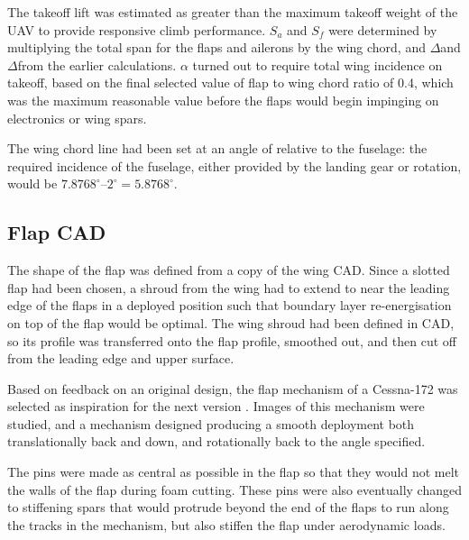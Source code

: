 \documentclass[../../main.tex]{subfiles}
\begin{document}
The takeoff lift was estimated as  greater than the maximum takeoff weight of the UAV to provide responsive climb performance.
$S_a$ and $S_f$ were determined by multiplying the total span for the flaps and ailerons by the wing chord, and $\Delta$\cla and $\Delta$\clf from the earlier calculations.
$\alpha$ turned out to require  total wing incidence on takeoff, based on the final selected value of flap to wing chord ratio of 0.4, which was the maximum reasonable value before the flaps would begin impinging on electronics or wing spars.

The wing chord line had been set at an angle of  relative to the fuselage: the required incidence of the fuselage, either provided by the landing gear or rotation, would be $7.8768^\circ – 2^\circ = 5.8768^\circ$. 

\subsection{Flap CAD} \label{sec:final-design-proposal:wing:flap-cad}

The shape of the flap was defined from a copy of the wing CAD.
Since a slotted flap had been chosen, a shroud from the wing had to extend to near the leading edge of the flaps in a deployed position such that boundary layer re-energisation on top of the flap would be optimal.
The wing shroud had been defined in CAD, so its profile was transferred onto the flap profile, smoothed out, and then cut off from the leading edge and upper surface.  

Based on feedback on an original design, the flap mechanism of a Cessna-172 was selected as inspiration for the next version \cite{towell-19}.
Images of this mechanism were studied, and a mechanism designed producing a smooth deployment both translationally back and down, and rotationally back to the  angle specified. 


The pins were made as central as possible in the flap so that they would not melt the walls of the flap during foam cutting.
These pins were also eventually changed to stiffening spars that would protrude beyond the end of the flaps to run along the tracks in the mechanism, but also stiffen the flap under aerodynamic loads.

\end{document}
